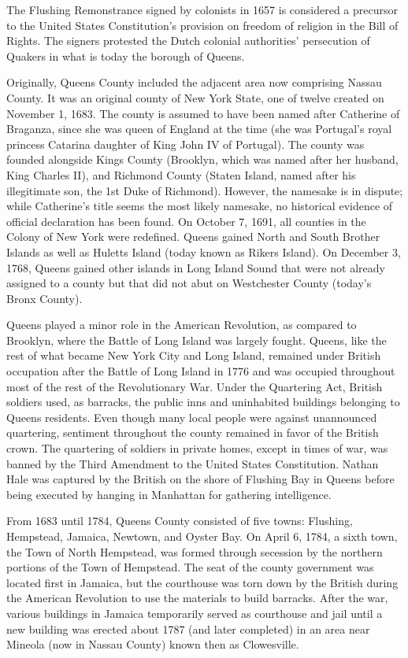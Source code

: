The Flushing Remonstrance signed by colonists in 1657 is considered a
precursor to the United States Constitution's provision on freedom of
religion in the Bill of Rights. The signers protested the Dutch colonial
authorities' persecution of Quakers in what is today the borough of
Queens.

Originally, Queens County included the adjacent area now comprising
Nassau County. It was an original county of New York State, one of
twelve created on November 1, 1683. The county is assumed to have been
named after Catherine of Braganza, since she was queen of England at the
time (she was Portugal's royal princess Catarina daughter of King John
IV of Portugal). The county was founded alongside Kings County
(Brooklyn, which was named after her husband, King Charles II), and
Richmond County (Staten Island, named after his illegitimate son, the
1st Duke of Richmond). However, the namesake is in dispute; while
Catherine's title seems the most likely namesake, no historical evidence
of official declaration has been found. On October 7, 1691, all counties
in the Colony of New York were redefined. Queens gained North and South
Brother Islands as well as Huletts Island (today known as Rikers
Island). On December 3, 1768, Queens gained other islands in Long Island
Sound that were not already assigned to a county but that did not abut
on Westchester County (today's Bronx County).

Queens played a minor role in the American Revolution, as compared to
Brooklyn, where the Battle of Long Island was largely fought. Queens,
like the rest of what became New York City and Long Island, remained
under British occupation after the Battle of Long Island in 1776 and was
occupied throughout most of the rest of the Revolutionary War. Under the
Quartering Act, British soldiers used, as barracks, the public inns and
uninhabited buildings belonging to Queens residents. Even though many
local people were against unannounced quartering, sentiment throughout
the county remained in favor of the British crown. The quartering of
soldiers in private homes, except in times of war, was banned by the
Third Amendment to the United States Constitution. Nathan Hale was
captured by the British on the shore of Flushing Bay in Queens before
being executed by hanging in Manhattan for gathering intelligence.

From 1683 until 1784, Queens County consisted of five towns: Flushing,
Hempstead, Jamaica, Newtown, and Oyster Bay. On April 6, 1784, a sixth
town, the Town of North Hempstead, was formed through secession by the
northern portions of the Town of Hempstead. The seat of the county
government was located first in Jamaica, but the courthouse was torn
down by the British during the American Revolution to use the materials
to build barracks. After the war, various buildings in Jamaica
temporarily served as courthouse and jail until a new building was
erected about 1787 (and later completed) in an area near Mineola (now in
Nassau County) known then as Clowesville.

